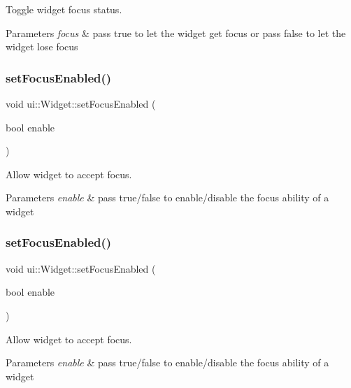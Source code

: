 Toggle widget focus status. 
\begin{DoxyParams}{Parameters}
{\em focus} & pass true to let the widget get focus or pass false to let the widget lose focus \\
\hline
\end{DoxyParams}
\mbox{\label{classui_1_1Widget_a017596c74cbd8b7304b27cf2b0eb4756}} 
\subsubsection{\texorpdfstring{set\+Focus\+Enabled()}{setFocusEnabled()}\hspace{0.1cm}{\footnotesize\ttfamily [1/2]}}
{\footnotesize\ttfamily void ui\+::\+Widget\+::set\+Focus\+Enabled (\begin{DoxyParamCaption}\item[{bool}]{enable }\end{DoxyParamCaption})}

Allow widget to accept focus. 
\begin{DoxyParams}{Parameters}
{\em enable} & pass true/false to enable/disable the focus ability of a widget \\
\hline
\end{DoxyParams}
\mbox{\label{classui_1_1Widget_a017596c74cbd8b7304b27cf2b0eb4756}} 
\subsubsection{\texorpdfstring{set\+Focus\+Enabled()}{setFocusEnabled()}\hspace{0.1cm}{\footnotesize\ttfamily [2/2]}}
{\footnotesize\ttfamily void ui\+::\+Widget\+::set\+Focus\+Enabled (\begin{DoxyParamCaption}\item[{bool}]{enable }\end{DoxyParamCaption})}

Allow widget to accept focus. 
\begin{DoxyParams}{Parameters}
{\em enable} & pass true/false to enable/disable the focus ability of a widget \\
\hline
\end{DoxyParams}
\mbox{\label{classui_1_1Widget_ad18c81cef2447dcfb59b7f4250b0eeeb}} 

